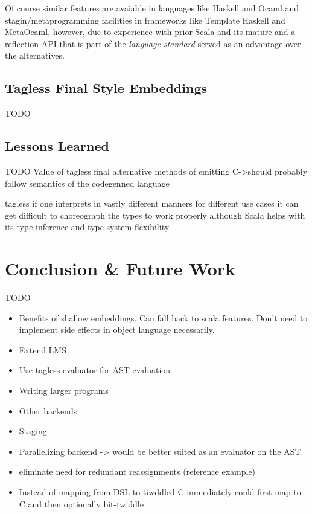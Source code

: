 \documentclass{article}
\begin{document}
Of course similar features are avaiable in languages like Haskell and Ocaml and stagin/metaprogramming facilities in frameworks like Template Haskell and MetaOcaml, however, due to experience with prior Scala and its mature and a reflection API that is part of the \textit{language standard}
served as an advantage over the alternatives.

\subsection{Tagless Final Style Embeddings}\label{subsec:tagless}
TODO
\subsection{Lessons Learned}
TODO
Value of tagless final
alternative methods of emitting C->should probably follow semantics of the codegenned language

tagless if one interprets in vastly different manners for different use cases it can get difficult to choreograph the types to work properly although Scala helps with its type inference and type system flexibility
\section{Conclusion \& Future Work}
TODO
\begin{itemize}
	\item Benefits of shallow embeddings. Can fall back to scala features. Don't need to implement side effects in object language necessarily.
	\item Extend LMS
	\item Use tagless evaluator for AST evaluation
	\item Writing larger programs
	\item Other backends
	\item Staging
	\item Parallelizing backend -> would be better suited as an evaluator on the AST
	\item eliminate need for redundant reassignments (reference example)
	\item Instead of mapping from DSL to tiwddled C immediately could first map to C and then optionally bit-twiddle
\end{itemize}



\end{document}
